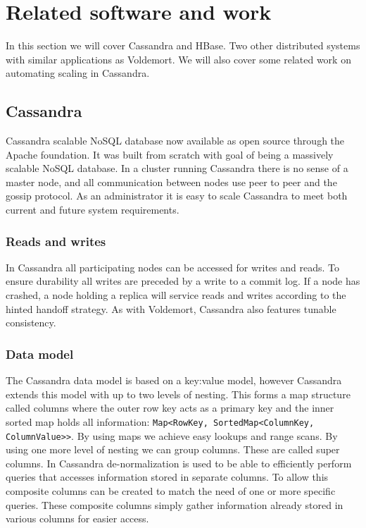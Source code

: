 \section{Related software and work}
In this section we will cover Cassandra and HBase. Two other distributed systems with similar applications as Voldemort. We will also cover some related work on automating scaling in Cassandra. 

\subsection{Cassandra}
Cassandra scalable NoSQL database now available as open source through the Apache foundation. It was built from scratch with goal of being a massively scalable NoSQL database. In a cluster running Cassandra there is no sense of a master node, and all communication between nodes use peer to peer and the gossip protocol. As an administrator it is easy to scale Cassandra to meet both current and future system requirements. 

\subsubsection{Reads and writes}
In Cassandra all participating nodes can be accessed for writes and reads. To ensure durability all writes are preceded by a write to a commit log. If a node has crashed, a node holding a replica will service reads and writes according to the hinted handoff strategy. As with Voldemort, Cassandra also features tunable consistency. 

\subsubsection{Data model}
The Cassandra data model is based on a key:value model, however Cassandra extends this model with up to two levels of nesting. This forms a map structure called columns where the outer row key acts as a primary key and the inner sorted map holds all information: \texttt{Map<RowKey, SortedMap<ColumnKey, ColumnValue>>}. By using maps we achieve easy lookups and range scans. By using one more level of nesting we can group columns. These are called super columns. In Cassandra de-normalization is used to be able to efficiently perform queries that accesses information stored in separate columns. To allow this composite columns can be created to match the need of one or more specific queries. These composite columns simply gather information already stored in various columns for easier access. 

